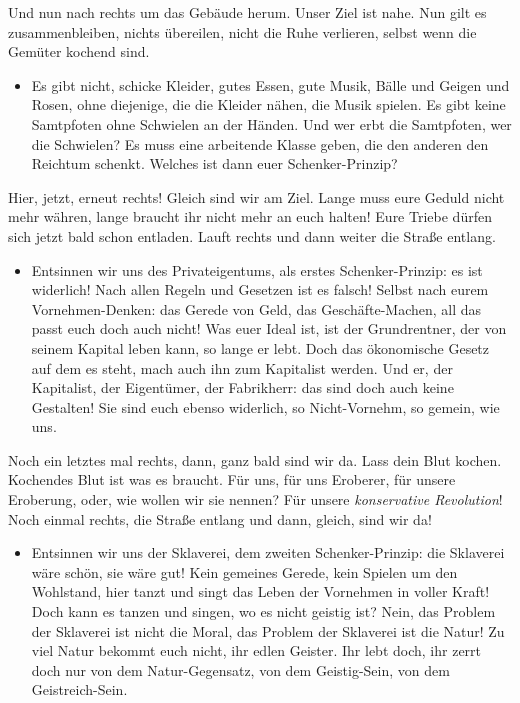 \documentclass[a4paper, 12pt]{report}
\begin{document}
Und nun nach rechts um das Gebäude herum. 
Unser Ziel ist nahe. 
Nun gilt es zusammenbleiben, nichts übereilen, nicht die Ruhe verlieren, selbst wenn die Gemüter kochend sind.

\begin{itemize}\em
\item[] Es gibt nicht, schicke Kleider, gutes Essen, gute Musik, Bälle und Geigen und Rosen, ohne diejenige, die die Kleider nähen, die Musik spielen.
    Es gibt keine Samtpfoten ohne Schwielen an der Händen.
    Und wer erbt die Samtpfoten, wer die Schwielen?
    Es muss eine arbeitende Klasse geben, die den anderen den Reichtum schenkt.
    Welches ist dann euer Schenker-Prinzip?
\end{itemize}

Hier, jetzt, erneut rechts! 
Gleich sind wir am Ziel. 
Lange muss eure Geduld nicht mehr währen, lange braucht ihr nicht mehr an euch halten!
Eure Triebe dürfen sich jetzt bald schon entladen. 
Lauft rechts und dann weiter die Straße entlang.

\begin{itemize}\em
\item[] Entsinnen wir uns des Privateigentums, als erstes Schenker-Prinzip: 
    es ist widerlich! 
    Nach allen Regeln und Gesetzen ist es falsch! 
    Selbst nach eurem Vornehmen-Denken: das Gerede von Geld, das Geschäfte-Machen, all das passt euch doch auch nicht!
    Was euer Ideal ist, ist der Grundrentner, der von seinem Kapital leben kann, so lange er lebt. 
    Doch das ökonomische Gesetz auf dem es steht, mach auch ihn zum Kapitalist werden.
    Und er, der Kapitalist, der Eigentümer, der Fabrikherr: das sind doch auch keine Gestalten!
    Sie sind euch ebenso widerlich, so Nicht-Vornehm, so gemein, wie uns.
\end{itemize}

Noch ein letztes mal rechts, dann, ganz bald sind wir da. 
Lass dein Blut kochen.
Kochendes Blut ist was es braucht. Für uns, für uns Eroberer, für unsere Eroberung, oder, wie wollen wir sie nennen? 
Für unsere \textit{konservative Revolution}!
Noch einmal rechts, die Straße entlang und dann, gleich, sind wir da!

\begin{itemize}\em
\item[] Entsinnen wir uns der Sklaverei, dem zweiten Schenker-Prinzip: 
    die Sklaverei wäre schön, sie wäre gut! 
    Kein gemeines Gerede, kein Spielen um den Wohlstand, hier tanzt und singt das Leben der Vornehmen in voller Kraft! 
    Doch kann es tanzen und singen, wo es nicht geistig ist? 
    Nein, das Problem der Sklaverei ist nicht die Moral, das Problem der Sklaverei ist die Natur!
    Zu viel Natur bekommt euch nicht, ihr edlen Geister.
    Ihr lebt doch, ihr zerrt doch nur von dem Natur-Gegensatz, von dem Geistig-Sein, von dem Geistreich-Sein.
\end{itemize}
\end{document}
